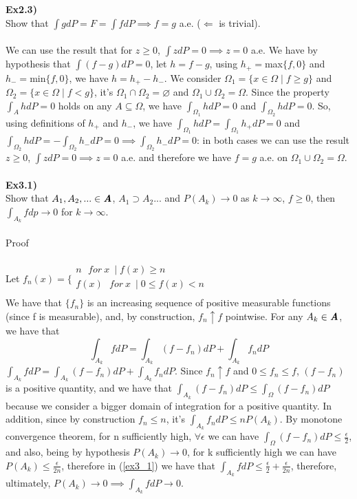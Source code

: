 \documentclass[12pt,mythesisstyle]{report}
\begin{document}
\textbf{Ex2.3)}\\
Show that $\int gdP=F=\int fdP\implies f=g$ a.e. ($\Longleftarrow$ is trivial).
\\\\
We can use the result that for $z\geq 0$, $\int zdP=0 \implies z=0$ a.e. We have by hypothesis that $\int (f-g)dP=0$, let $h=f-g$, using $h_+=$max$\{f,0\}$ and $h_-=$min$\{f,0\}$, we have $h=h_+-h_-$. We consider $\Omega_1=\{x\in\Omega \mid f\geq g\}$ and $\Omega_2=\{x\in\Omega \mid f<g\}$, it's $\Omega_1\cap\Omega_2=\varnothing$ and $\Omega_1\cup\Omega_2=\Omega$. Since the property $\int_A hdP=0$ holds on any $A\subseteq\Omega$, we have $\int_{\Omega_1} hdP=0$ and $\int_{\Omega_2} hdP=0$. So, using definitions of $h_+$ and $h_-$, we have $\int_{\Omega_1} hdP=\int_{\Omega_1} h_+dP=0$ and $\int_{\Omega_2} hdP=-\int_{\Omega_2} h_-dP=0\implies\int_{\Omega_2} h_-dP=0$: in both cases we can use the result $z\geq 0$, $\int zdP=0 \implies z=0$ a.e. and therefore we have $f=g$ a.e. on $\Omega_1\cup\Omega_2=\Omega$.
\\\\
\textbf{Ex3.1)}\\
Show that $A_1, A_2,...\in\textbf{\textit{A}}$, $A_1\supset A_2...$ and $P(A_k)\rightarrow 0$ as $k\rightarrow\infty$, $f\geq 0$, then $\int_{A_k}fdp\rightarrow0$ for $k\rightarrow\infty$.
\\\\
Proof\\
\\Let $f_n(x)=\bigg\{
\begin{array}{ll}
n \ \ \ for \ x \ \mid f(x)\geq n\\
f(x) \ \ \ for \  x \ \mid 0\leq f(x)<n\\
\end{array}$
\\
We have that $\{f_n\}$ is an increasing sequence of positive measurable functions (since f is measurable), and, by construction, $f_n \uparrow f$ pointwise. For any $A_k\in\textbf{\textit{A}}$, we have that
\begin{equation} \label{ex3_1}
\int_{A_k}f dP=\int_{A_k}(f-f_n) dP+\int_{A_k}f_n dP
\end{equation}
$\int_{A_k}f dP=\int_{A_k}(f-f_n) dP+\int_{A_k}f_n dP$. Since $f_n \uparrow f$ and $0\leq f_n\leq f$, $(f-f_n)$ is a positive quantity, and we have that $\int_{A_k}(f-f_n) dP\leq\int_{\Omega}(f-f_n)dP$ because we consider a bigger domain of integration for a positive quantity. In addition, since by construction $f_n\leq n$, it's $\int_{A_k}f_n dP\leq nP(A_k)$. By monotone convergence theorem, for n sufficiently high, $\forall \epsilon$ we can have $\int_{\Omega}(f-f_n)dP\leq \frac{\epsilon}{2}$, and also, being by hypothesis $P(A_k)\rightarrow 0$, for k sufficiently high we can have $P(A_k)\leq\frac{\epsilon}{2n}$, therefore in (\ref{ex3_1}) we have that $\int_{A_k}f dP\leq \frac{\epsilon}{2}+\frac{\epsilon}{2n}$, therefore, ultimately, $P(A_k)\rightarrow 0\implies\int_{A_k}f dP\rightarrow 0$.
\end{document}
